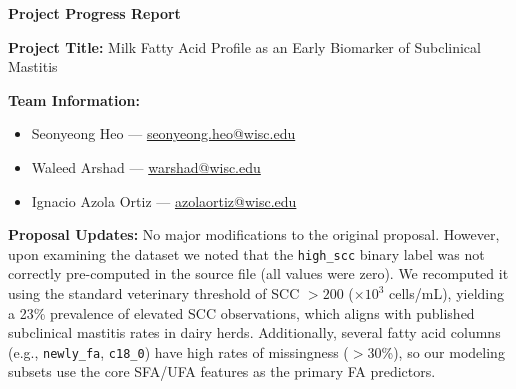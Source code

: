 \documentclass[11pt]{article}
\begin{document}
\begin{center}
  {\large\textbf{Project Progress Report}}
\end{center}

\vspace{-4pt}

\noindent\textbf{Project Title:} Milk Fatty Acid Profile as an Early Biomarker of Subclinical Mastitis

\medskip
\noindent\textbf{Team Information:}
\begin{itemize}
  \item Seonyeong Heo — \href{mailto:seonyeong.heo@wisc.edu}{seonyeong.heo@wisc.edu}
  \item Waleed Arshad — \href{mailto:warshad@wisc.edu}{warshad@wisc.edu}
  \item Ignacio Azola Ortiz — \href{mailto:azolaortiz@wisc.edu}{azolaortiz@wisc.edu}
\end{itemize}

\medskip
\noindent\textbf{Proposal Updates:}
No major modifications to the original proposal. However, upon examining the dataset we noted that the \texttt{high\_scc} binary label was not correctly pre-computed in the source file (all values were zero). We recomputed it using the standard veterinary threshold of SCC $> 200$ ($\times 10^3$ cells/mL), yielding a 23\% prevalence of elevated SCC observations, which aligns with published subclinical mastitis rates in dairy herds. Additionally, several fatty acid columns (e.g., \texttt{newly\_fa}, \texttt{c18\_0}) have high rates of missingness ($>$30\%), so our modeling subsets use the core SFA/UFA features as the primary FA predictors.
\end{document}
